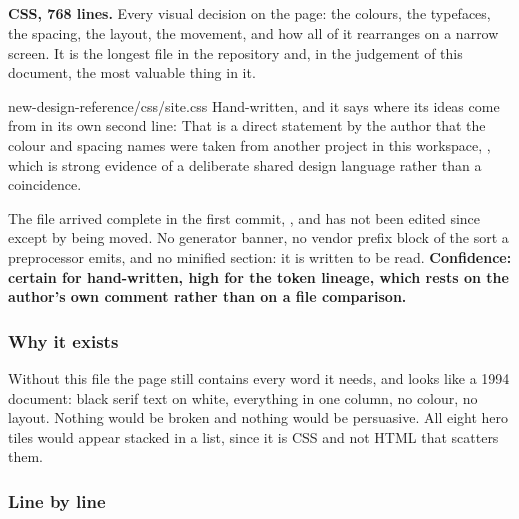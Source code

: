 \subsection{}

\textbf{CSS, 768 lines.} Every visual decision on the page: the colours, the
typefaces, the spacing, the layout, the movement, and how all of it rearranges on
a narrow screen. It is the longest file in the repository and, in the judgement
of this document, the most valuable thing in it.

\begin{provenance}{new-design-reference/css/site.css}
Hand-written, and it says where its ideas come from in its own second line:
That is a direct statement by the author that the colour and spacing names were
taken from another project in this workspace, , which is
strong evidence of a deliberate shared design language rather than a coincidence.

The file arrived complete in the first commit, , and has not been
edited since except by being moved. No generator banner, no vendor prefix block
of the sort a preprocessor emits, and no minified section: it is written to be
read. \textbf{Confidence: certain for hand-written, high for the token lineage,
which rests on the author's own comment rather than on a file comparison.}
\end{provenance}

\subsubsection*{Why it exists}

Without this file the page still contains every word it needs, and looks like a
1994 document: black serif text on white, everything in one column, no colour, no
layout. Nothing would be broken and nothing would be persuasive. All eight hero
tiles would appear stacked in a list, since it is CSS and not HTML that scatters
them.

\subsubsection*{Line by line}

